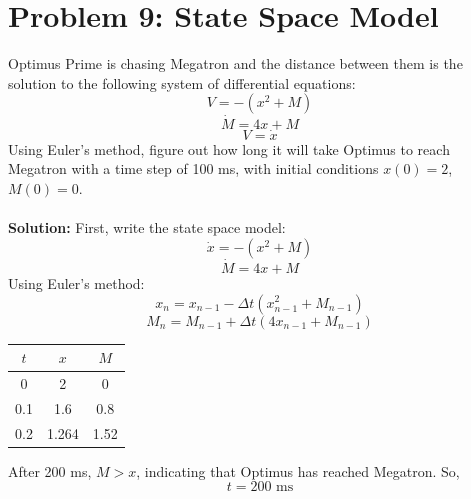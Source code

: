 \documentclass{article}
\begin{document}
\section*{Problem 9: State Space Model} 
Optimus Prime is chasing Megatron and the distance between them is the solution to the following system of differential equations:
\begin{equation}
    V=-(x^2 + M) \nonumber
\end{equation}
\begin{equation}
    \dot{M}=4x+M \nonumber
\end{equation}
\begin{equation}
    V=\dot{x} \nonumber
\end{equation}
Using Euler's method, figure out how long it will take Optimus to reach Megatron with a time step of 100 ms, with initial conditions $x(0)=2$, $M(0)=0$.\\ \\
\textbf{Solution:}
First, write the state space model:
$$\dot{x} = -(x^2 + M)$$
$$\dot{M} = 4x+M$$
Using Euler's method:
$$x_n = x_{n-1} - \Delta t (x^2_{n-1} + M_{n-1})$$
$$M_n = M_{n-1} + \Delta t (4x_{n-1} + M_{n-1})$$
\begin{table}[!htb]
    \centering
    \begin{tabular}{c|c|c}
        $t$ & $x$ & $M$  \\ \hline
        0 & 2 & 0\\ \hline
        0.1 & 1.6 & 0.8\\ \hline
        0.2 & 1.264 & 1.52
    \end{tabular}
\end{table}
After 200 ms, $M > x$, indicating that Optimus has reached Megatron.  So,
$$\boxed{t = 200\text{ ms}}$$
\newpage %
\noindent 
\end{document}
